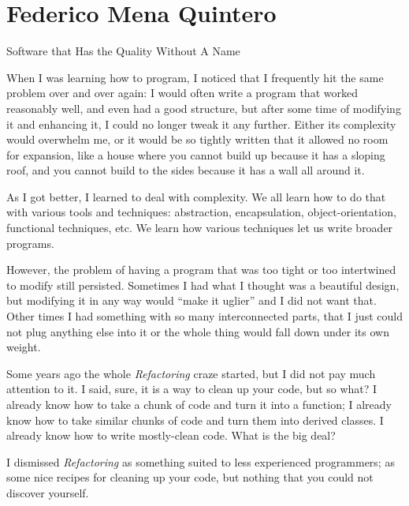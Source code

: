 
\chapter{Federico Mena Quintero}{Software that Has the Quality Without A Name}

When I was learning how to program, I noticed that I frequently hit the same
problem over and over again: I would often write a program that worked
reasonably well, and even had a good structure, but after some time of modifying
it and enhancing it, I could no longer tweak it any further. Either its
complexity would overwhelm me, or it would be so tightly written that it allowed
no room for expansion, like a house where you cannot build up because it has a
sloping roof, and you cannot build to the sides because it has a wall all around
it.

As I got better, I learned to deal with complexity. We all learn how to do that
with various tools and techniques: abstraction, encapsulation,
object-orientation, functional techniques, etc. We learn how various techniques
let us write broader programs.

However, the problem of having a program that was too tight or too intertwined
to modify still persisted. Sometimes I had what I thought was a beautiful
design, but modifying it in any way would ``make it uglier'' and I did not want
that. Other times I had something with so many interconnected parts, that I just
could not plug anything else into it or the whole thing would fall down under
its own weight.

Some years ago the whole \textit{Refactoring} craze started, but I did not pay
much attention to it. I said, sure, it is a way to clean up your code, but so
what? I already know how to take a chunk of code and turn it into a function; I
already know how to take similar chunks of code and turn them into derived
classes. I already know how to write mostly-clean code. What is the big deal?

I dismissed \textit{Refactoring} as something suited to less experienced
programmers; as some nice recipes for cleaning up your code, but nothing that
you could not discover yourself.

